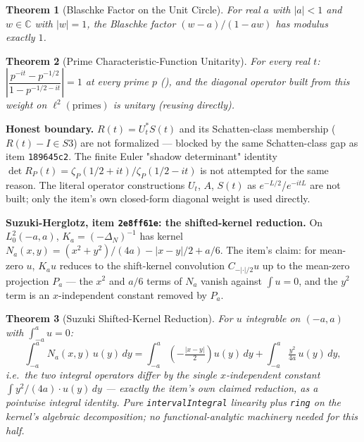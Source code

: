\documentclass{report}
\newtheorem{theorem}{Theorem}[chapter]
\theoremstyle{definition}
\begin{document}
\begin{theorem}[Blaschke Factor on the Unit Circle]
  \label{thm:blaschke-modulus}
  \leanok
  For real $a$ with $|a|<1$ and $w\in\mathbb{C}$ with $|w|=1$, the Blaschke factor
  $(w-a)/(1-aw)$ has modulus exactly $1$.
\end{theorem}

\begin{theorem}[Prime Characteristic-Function Unitarity]
  \label{thm:prime-charfn-unitary}
  \leanok
  For every real $t$: $\left|\dfrac{p^{-it}-p^{-1/2}}{1-p^{-1/2-it}}\right|=1$ at every
  prime $p$ (), and the diagonal operator
  built from this weight on $\ell^2(\text{primes})$ is unitary (reusing
   directly).
\end{theorem}

\textbf{Honest boundary.} $R(t)=U_t^*S(t)$ and its Schatten-class membership
($R(t)-I\in S3$) are not formalized --- blocked by the same Schatten-class gap as item
\texttt{189645c2}. The finite Euler "shadow determinant" identity
$\det R_P(t)=\zeta_P(1/2+it)/\zeta_P(1/2-it)$ is not attempted for the same reason. The
literal operator constructions $U_t$, $A$, $S(t)$ as $e^{-L/2}$/$e^{-itL}$ are not built;
only the item's own closed-form diagonal weight is used directly.

\textbf{Suzuki-Herglotz, item \texttt{2e8ff61e}: the shifted-kernel reduction.} On
$L^2_0(-a,a)$, $K_a=(-\Delta_N)^{-1}$ has kernel $N_a(x,y)=(x^2+y^2)/(4a)-|x-y|/2+a/6$.
The item's claim: for mean-zero $u$, $K_a u$ reduces to the shift-kernel convolution
$C_{-|\cdot|/2}u$ up to the mean-zero projection $P_a$ --- the $x^2$ and $a/6$ terms of
$N_a$ vanish against $\int u=0$, and the $y^2$ term is an $x$-independent constant
removed by $P_a$.

\begin{theorem}[Suzuki Shifted-Kernel Reduction]
  \label{thm:suzuki-kernel-reduction}
  \leanok
  For $u$ integrable on $(-a,a)$ with $\int_{-a}^{a}u=0$:
  \[\int_{-a}^{a}N_a(x,y)\,u(y)\,dy=\int_{-a}^{a}\left(-\tfrac{|x-y|}{2}\right)u(y)\,dy
    +\int_{-a}^{a}\tfrac{y^2}{4a}\,u(y)\,dy,\]
  i.e.\ the two integral operators differ by the single $x$-independent constant
  $\int y^2/(4a)\cdot u(y)\,dy$ --- exactly the item's own claimed reduction, as a
  pointwise integral identity. Pure \texttt{intervalIntegral} linearity plus \texttt{ring}
  on the kernel's algebraic decomposition; no functional-analytic machinery needed for
  this half.
\end{theorem}
\end{document}
